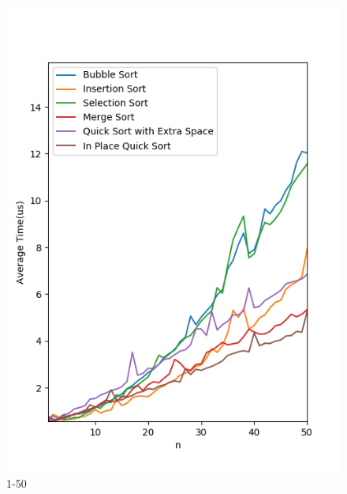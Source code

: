 \documentclass{article}
\begin{document}
\begin{figure}[htbp]
\begin{minipage}[t]{0.35\textwidth}
        \includegraphics[width=\textwidth]{zero_fifty.png}
        \caption{1-50}
    \end{minipage}
    \begin{minipage}[t]{0.35\textwidth}
        \centering

\end{minipage}
\end{figure}
\end{document}
